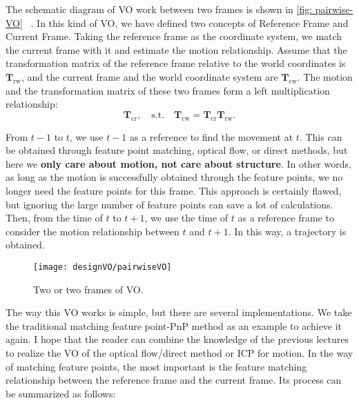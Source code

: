 The schematic diagram of VO work between two frames is shown in \autoref{fig: pairwise-VO} ~. In this kind of VO, we have defined two concepts of Reference Frame and Current Frame. Taking the reference frame as the coordinate system, we match the current frame with it and estimate the motion relationship. Assume that the transformation matrix of the reference frame relative to the world coordinates is $ \bm{T} _ \mathrm{rw} $, and the current frame and the world coordinate system are $ \bm{T} _ \mathrm{cw} $. The motion and the transformation matrix of these two frames form a left multiplication relationship:
\[
\bm{T}_\mathrm{cr}, \quad \mathrm{s.t.} \quad \bm{T}_\mathrm{cw} = \bm{T}_\mathrm{cr} \bm{T}_\mathrm{rw}.
\]

From $ t-1 $ to $ t $, we use $ t-1 $ as a reference to find the movement at $ t $. This can be obtained through feature point matching, optical flow, or direct methods, but here we \textbf{only care about motion, not care about structure}. In other words, as long as the motion is successfully obtained through the feature points, we no longer need the feature points for this frame. This approach is certainly flawed, but ignoring the large number of feature points can save a lot of calculations. Then, from the time of $ t $ to $ t + 1 $, we use the time of $ t $ as a reference frame to consider the motion relationship between $ t $ and $ t + 1 $. In this way, a trajectory is obtained.

\begin{figure}[!ht]
\centering
\texttt{[image: designVO/pairwiseVO]} \\
\caption{Two or two frames of VO. }
\label{fig: pairwise-VO}
\end{figure}

The way this VO works is simple, but there are several implementations. We take the traditional matching feature point-PnP method as an example to achieve it again. I hope that the reader can combine the knowledge of the previous lectures to realize the VO of the optical flow/direct method or ICP for motion. In the way of matching feature points, the most important is the feature matching relationship between the reference frame and the current frame. Its process can be summarized as follows:

